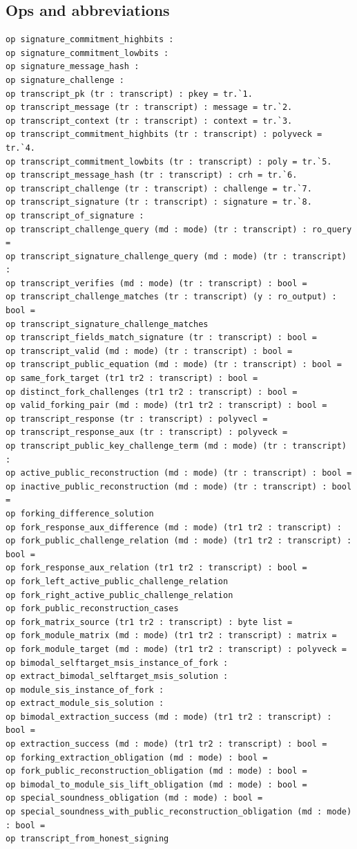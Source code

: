 \subsection*{Ops and abbreviations}
\begin{lstlisting}[language=EasyCrypt,basicstyle=\ttfamily\tiny]
op signature_commitment_highbits :
op signature_commitment_lowbits :
op signature_message_hash :
op signature_challenge :
op transcript_pk (tr : transcript) : pkey = tr.`1.
op transcript_message (tr : transcript) : message = tr.`2.
op transcript_context (tr : transcript) : context = tr.`3.
op transcript_commitment_highbits (tr : transcript) : polyveck = tr.`4.
op transcript_commitment_lowbits (tr : transcript) : poly = tr.`5.
op transcript_message_hash (tr : transcript) : crh = tr.`6.
op transcript_challenge (tr : transcript) : challenge = tr.`7.
op transcript_signature (tr : transcript) : signature = tr.`8.
op transcript_of_signature :
op transcript_challenge_query (md : mode) (tr : transcript) : ro_query =
op transcript_signature_challenge_query (md : mode) (tr : transcript) :
op transcript_verifies (md : mode) (tr : transcript) : bool =
op transcript_challenge_matches (tr : transcript) (y : ro_output) : bool =
op transcript_signature_challenge_matches
op transcript_fields_match_signature (tr : transcript) : bool =
op transcript_valid (md : mode) (tr : transcript) : bool =
op transcript_public_equation (md : mode) (tr : transcript) : bool =
op same_fork_target (tr1 tr2 : transcript) : bool =
op distinct_fork_challenges (tr1 tr2 : transcript) : bool =
op valid_forking_pair (md : mode) (tr1 tr2 : transcript) : bool =
op transcript_response (tr : transcript) : polyvecl =
op transcript_response_aux (tr : transcript) : polyveck =
op transcript_public_key_challenge_term (md : mode) (tr : transcript) :
op active_public_reconstruction (md : mode) (tr : transcript) : bool =
op inactive_public_reconstruction (md : mode) (tr : transcript) : bool =
op forking_difference_solution
op fork_response_aux_difference (md : mode) (tr1 tr2 : transcript) :
op fork_public_challenge_relation (md : mode) (tr1 tr2 : transcript) : bool =
op fork_response_aux_relation (tr1 tr2 : transcript) : bool =
op fork_left_active_public_challenge_relation
op fork_right_active_public_challenge_relation
op fork_public_reconstruction_cases
op fork_matrix_source (tr1 tr2 : transcript) : byte list =
op fork_module_matrix (md : mode) (tr1 tr2 : transcript) : matrix =
op fork_module_target (md : mode) (tr1 tr2 : transcript) : polyveck =
op bimodal_selftarget_msis_instance_of_fork :
op extract_bimodal_selftarget_msis_solution :
op module_sis_instance_of_fork :
op extract_module_sis_solution :
op bimodal_extraction_success (md : mode) (tr1 tr2 : transcript) : bool =
op extraction_success (md : mode) (tr1 tr2 : transcript) : bool =
op forking_extraction_obligation (md : mode) : bool =
op fork_public_reconstruction_obligation (md : mode) : bool =
op bimodal_to_module_sis_lift_obligation (md : mode) : bool =
op special_soundness_obligation (md : mode) : bool =
op special_soundness_with_public_reconstruction_obligation (md : mode) : bool =
op transcript_from_honest_signing
\end{lstlisting}

